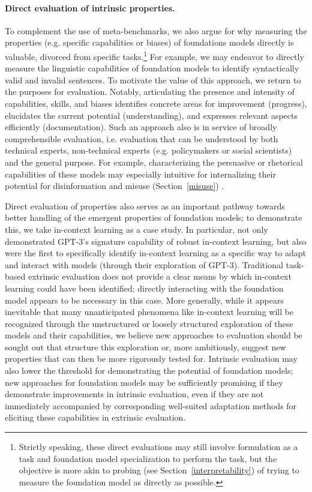 \paragraph{Direct evaluation of intrinsic properties.} To complement the use of meta-benchmarks, we also argue for why measuring the properties (e.g. specific capabilities or biases) of foundations models directly is valuable, divorced from specific tasks.\footnote{Strictly speaking, these direct evaluations may still involve formulation as a task and foundation model specialization to perform the task, but the objective is more akin to probing (see Section~\ref{interpretability}) of trying to measure the foundation model as directly as possible.} For example, we may endeavor to directly measure the linguistic capabilities of foundation models to identify syntactically valid and invalid sentences. To motivate the value of this approach, we return to the purposes for evaluation. Notably, articulating the presence and intensity of capabilities, skills, and biases identifies concrete areas for improvement (progress), elucidates the current potential (understanding), and expresses relevant aspects efficiently (documentation). Such an approach also is in service of broadly comprehensible evaluation, i.e. evaluation that can be understood by both technical experts, non-technical experts (e.g. policymakers or social scientists) and the general purpose. For example, characterizing the persuasive or rhetorical capabilities of these models may especially intuitive for internalizing their potential for disinformation and misuse (Section~\ref{misuse}) \citep{BuchananCSET2021}.

Direct evaluation of properties also serves as an important pathway towards better handling of the emergent properties of foundation models; to demonstrate this, we take in-context learning as a case study. In particular, \citet{brown2020gpt3} not only demonstrated GPT-3's signature capability of robust in-context learning, but also were the first to specifically identify in-context learning as a specific way to adapt and interact with models (through their exploration of GPT-3). Traditional task-based extrinsic evaluation does not provide a clear means by which in-context learning could have been identified; directly interacting with the foundation model appears to be necessary in this case. More generally, while it appears inevitable that many unanticipated phenomena like in-context learning will be recognized through the unstructured or loosely structured exploration of these models and their capabilities, we believe new approaches to evaluation should be sought out that structure this exploration or, more ambitiously, suggest new properties that can then be more rigorously tested for. Intrinsic evaluation may also lower the threshold for demonstrating the potential of foundation models; new approaches for foundation models may be sufficiently promising if they demonstrate improvements in intrinsic evaluation, even if they are not immediately accompanied by corresponding well-suited adaptation methods for eliciting these capabilities in extrinsic evaluation.

